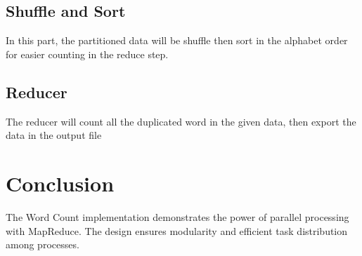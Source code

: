 \documentclass{article}
\begin{document}
	\subsection*{Shuffle and Sort}
	In this part, the partitioned data will be shuffle then sort in the alphabet order for easier counting in the reduce step.
		
	\subsection*{Reducer}
	The reducer will count all the duplicated word in the given data, then export the data in the output file
	
	\section*{Conclusion}
	The Word Count implementation demonstrates the power of parallel processing with MapReduce. The design ensures modularity and efficient task distribution among processes.
	
\end{document}
